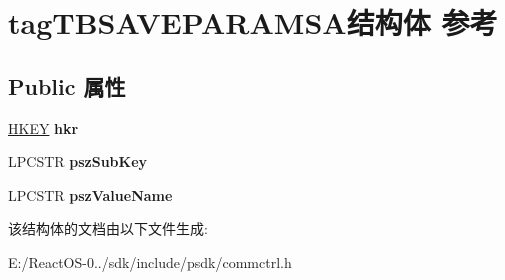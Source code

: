 \hypertarget{structtag_t_b_s_a_v_e_p_a_r_a_m_s_a}{}\section{tag\+T\+B\+S\+A\+V\+E\+P\+A\+R\+A\+M\+S\+A结构体 参考}
\label{structtag_t_b_s_a_v_e_p_a_r_a_m_s_a}
\subsection*{Public 属性}
\begin{DoxyCompactItemize}
\item 
\mbox{\label{structtag_t_b_s_a_v_e_p_a_r_a_m_s_a_a1b87564f9c9388c09318f6a809bb85d5}} 
\hyperlink{interfacevoid}{H\+K\+EY} {\bfseries hkr}
\item 
\mbox{\label{structtag_t_b_s_a_v_e_p_a_r_a_m_s_a_a981043f6a4e11bd9399c6982ba6b1ded}} 
L\+P\+C\+S\+TR {\bfseries psz\+Sub\+Key}
\item 
\mbox{\label{structtag_t_b_s_a_v_e_p_a_r_a_m_s_a_ac609fffda9953e69f3bfcd3435d81e7e}} 
L\+P\+C\+S\+TR {\bfseries psz\+Value\+Name}
\end{DoxyCompactItemize}


该结构体的文档由以下文件生成\+:\begin{DoxyCompactItemize}
\item 
E\+:/\+React\+O\+S-\/0../sdk/include/psdk/commctrl.\+h\end{DoxyCompactItemize}
